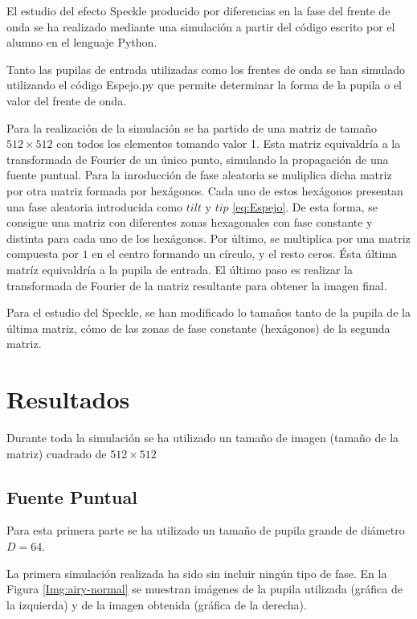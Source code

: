 \documentclass[twoside]{article}
\begin{document}
			El estudio del efecto Speckle producido por diferencias en la fase del frente de onda se ha realizado mediante una simulación a partir del código \cite{Speckle} escrito por el alumno en el lenguaje Python.

			Tanto las pupilas de entrada utilizadas como los frentes de onda se han simulado utilizando el código Espejo.py que permite determinar la forma de la pupila o el valor del frente de onda.

			Para la realización de la simulación se ha partido de una matriz de tamaño $512\times512$ con todos los elementos tomando valor 1. Esta matriz equivaldría a la transformada de Fourier de un único punto, simulando la propagación de una fuente puntual. Para la inroducción de fase aleatoria se muliplica dicha matriz por otra matriz formada por hexágonos. Cada uno de estos hexágonos presentan una fase aleatoria introducida como $tilt$ y $tip$ \ref{eq:Espejo}. De esta forma, se consigue una matriz con diferentes zonas hexagonales con fase constante y distinta para cada uno de los hexágonos. Por último, se multiplica por una matriz compuesta por $1$ en el centro formando un círculo, y el resto ceros. Ésta última matríz equivaldría a la pupila de entrada. El último paso es realizar la transformada de Fourier de la matriz resultante para obtener la imagen final.

			Para el estudio del Speckle, se han modificado lo tamaños tanto de la pupila de la última matriz, cómo de las zonas de fase constante (hexágonos) de la segunda matriz.

		\section{Resultados}

			Durante toda la simulación se ha utilizado un tamaño de imagen  (tamaño de la matriz) cuadrado de $512\times512$

			\subsection{Fuente Puntual}

				Para esta primera parte se ha utilizado un tamaño de pupila grande de diámetro $D = 64$.

				La primera simulación realizada ha sido sin incluir  ningún tipo de fase. En la Figura \ref{Img:airy-normal} se muestran imágenes de la pupila utilizada (gráfica de la izquierda) y de la imagen obtenida (gráfica de la derecha).
\end{document}
